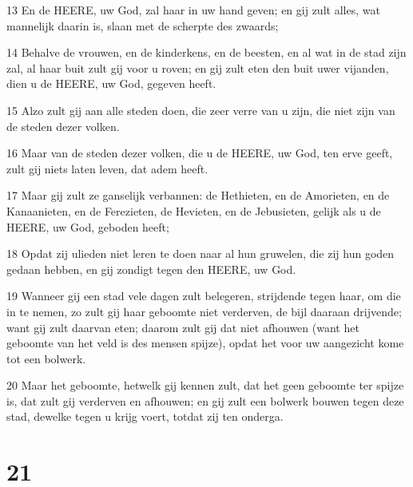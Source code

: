 \par 13 En de HEERE, uw God, zal haar in uw hand geven; en gij zult alles, wat mannelijk daarin is, slaan met de scherpte des zwaards;
\par 14 Behalve de vrouwen, en de kinderkens, en de beesten, en al wat in de stad zijn zal, al haar buit zult gij voor u roven; en gij zult eten den buit uwer vijanden, dien u de HEERE, uw God, gegeven heeft.
\par 15 Alzo zult gij aan alle steden doen, die zeer verre van u zijn, die niet zijn van de steden dezer volken.
\par 16 Maar van de steden dezer volken, die u de HEERE, uw God, ten erve geeft, zult gij niets laten leven, dat adem heeft.
\par 17 Maar gij zult ze ganselijk verbannen: de Hethieten, en de Amorieten, en de Kanaanieten, en de Ferezieten, de Hevieten, en de Jebusieten, gelijk als u de HEERE, uw God, geboden heeft;
\par 18 Opdat zij ulieden niet leren te doen naar al hun gruwelen, die zij hun goden gedaan hebben, en gij zondigt tegen den HEERE, uw God.
\par 19 Wanneer gij een stad vele dagen zult belegeren, strijdende tegen haar, om die in te nemen, zo zult gij haar geboomte niet verderven, de bijl daaraan drijvende; want gij zult daarvan eten; daarom zult gij dat niet afhouwen (want het geboomte van het veld is des mensen spijze), opdat het voor uw aangezicht kome tot een bolwerk.
\par 20 Maar het geboomte, hetwelk gij kennen zult, dat het geen geboomte ter spijze is, dat zult gij verderven en afhouwen; en gij zult een bolwerk bouwen tegen deze stad, dewelke tegen u krijg voert, totdat zij ten onderga.

\chapter{21}

